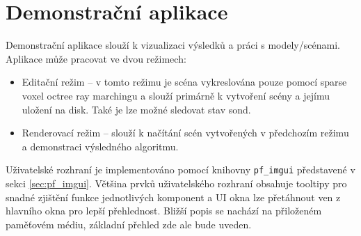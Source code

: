 \section{Demonstrační aplikace}
Demonstrační aplikace slouží k vizualizaci výsledků a práci s modely/scénami. Aplikace může pracovat ve dvou režimech:
\begin{itemize}
    \item Editační režim -- v tomto režimu je scéna vykreslována pouze pomocí sparse voxel octree ray marchingu a slouží primárně k vytvoření scény a jejímu uložení na disk. Také je lze možné sledovat stav sond.
    \item Renderovací režim -- slouží k načítání scén vytvořených v předchozím režimu a demonstraci výsledného algoritmu.
\end{itemize}

Uživatelské rozhraní je implementováno pomocí knihovny \texttt{pf\_imgui} představené v sekci \ref{sec:pf_imgui}. Většina prvků uživatelského rozhraní obsahuje tooltipy pro snadné zjištění funkce jednotlivých komponent a UI okna lze přetáhnout ven z hlavního okna pro lepší přehlednost. Bližší popis se nachází na přiloženém paměťovém médiu, základní přehled zde ale bude uveden.

